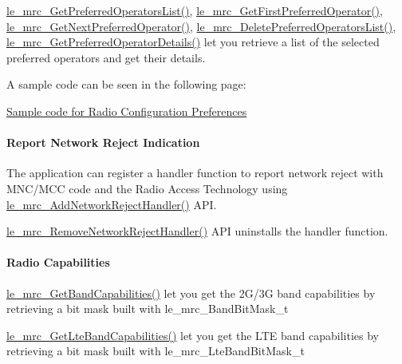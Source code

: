 \hyperlink{le__mrc__interface_8h_a1ea0d2943accd51d3b428e0e6c94d297}{le\+\_\+mrc\+\_\+\+Get\+Preferred\+Operators\+List()}, \hyperlink{le__mrc__interface_8h_a9648b653b7551cd065ec323b96a0aa1b}{le\+\_\+mrc\+\_\+\+Get\+First\+Preferred\+Operator()}, \hyperlink{le__mrc__interface_8h_a896703cabaacf97a70708d944cfbfc87}{le\+\_\+mrc\+\_\+\+Get\+Next\+Preferred\+Operator()}, \hyperlink{le__mrc__interface_8h_a60679f563ffecc8f107425b806edcdf0}{le\+\_\+mrc\+\_\+\+Delete\+Preferred\+Operators\+List()}, \hyperlink{le__mrc__interface_8h_a0ea2ddea624145387c5be285de1f59e5}{le\+\_\+mrc\+\_\+\+Get\+Preferred\+Operator\+Details()} let you retrieve a list of the selected preferred operators and get their details.

A sample code can be seen in the following page\+:
\begin{DoxyItemize}
\item \hyperlink{c_mrcRadioConfigurationPreferences}{Sample code for Radio Configuration Preferences}
\end{DoxyItemize}\hypertarget{c_mrc_le_mrc_NetworkRejectHandler}{}\paragraph{Report Network Reject Indication}\label{c_mrc_le_mrc_NetworkRejectHandler}
The application can register a handler function to report network reject with M\+N\+C/\+M\+CC code and the Radio Access Technology using \hyperlink{le__mrc__interface_8h_af3a8698b1b5c75d301b45aa129f80f62}{le\+\_\+mrc\+\_\+\+Add\+Network\+Reject\+Handler()} A\+PI.

\hyperlink{le__mrc__interface_8h_aa07a993c6457767f0a5a168a1681fa26}{le\+\_\+mrc\+\_\+\+Remove\+Network\+Reject\+Handler()} A\+PI uninstalls the handler function.\hypertarget{c_mrc_le_mrc_capabilities}{}\paragraph{Radio Capabilities}\label{c_mrc_le_mrc_capabilities}
\hyperlink{le__mrc__interface_8h_a7cb0a206729c652692701cd24226d34f}{le\+\_\+mrc\+\_\+\+Get\+Band\+Capabilities()} let you get the 2\+G/3G band capabilities by retrieving a bit mask built with {\ttfamily le\+\_\+mrc\+\_\+\+Band\+Bit\+Mask\+\_\+t} 

\hyperlink{le__mrc__interface_8h_ad6b44639b1d9755b92720d5184ee2515}{le\+\_\+mrc\+\_\+\+Get\+Lte\+Band\+Capabilities()} let you get the L\+TE band capabilities by retrieving a bit mask built with {\ttfamily le\+\_\+mrc\+\_\+\+Lte\+Band\+Bit\+Mask\+\_\+t} 


